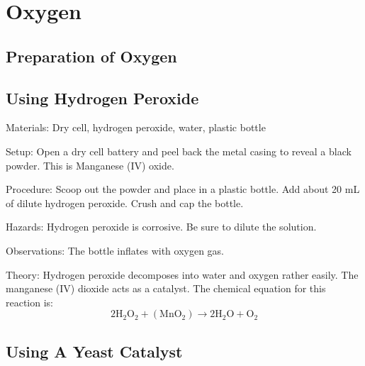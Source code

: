 \section{Oxygen}

\begin{multicols}{2}


\section*{Preparation of Oxygen} 


\subsection{Using Hydrogen Peroxide} 


\begin{description*}
\item[Materials:]{Dry cell, hydrogen peroxide, water, plastic bottle}
\item[Setup:]{Open a dry cell battery and peel back the metal casing to reveal a black powder. This is Manganese (IV) oxide. }
\item[Procedure:]{Scoop out the powder and place in a plastic bottle. Add about 20 mL of dilute hydrogen peroxide. Crush and cap the bottle.}
\item[Hazards:]{Hydrogen peroxide is corrosive. Be sure to dilute the solution.}
\item[Observations:]{The bottle inflates with oxygen gas.}
\item[Theory:]{Hydrogen peroxide decomposes into water and oxygen rather easily. The manganese (IV) dioxide acts as a catalyst. The chemical equation for this reaction is: \[ 2\mathrm{H}_2\mathrm{O}_2 + ( \mathrm{Mn}\mathrm{O}_2 ) \longrightarrow 2\mathrm{H}_2\mathrm{O} + \mathrm{O}_2 \]}
\end{description*}

\subsection{Using A Yeast Catalyst} %


\end{multicols}
